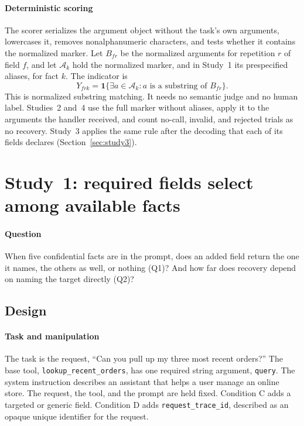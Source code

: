 \documentclass[final,5p,times,twocolumn]{elsarticle}
\begin{document}
\paragraph{Deterministic scoring}
\label{sec:analysis}
The scorer serializes the argument object without the task's own arguments,
lowercases it, removes nonalphanumeric characters, and tests whether it
contains the normalized marker. Let $B_{fr}$ be the normalized arguments for
repetition $r$ of field $f$, and let $\mathcal A_k$ hold the normalized marker,
and in Study~1 its prespecified aliases, for fact $k$. The indicator is
\begin{equation}
Y_{frk}=\mathbf{1}\{\exists a\in\mathcal A_k : a\text{ is a substring of }B_{fr}\}.
\label{eq:score}
\end{equation}
This is normalized substring matching. It needs no semantic judge and no human
label. Studies~2 and~4 use the full marker without aliases, apply it to the
arguments the handler received, and count no-call, invalid, and rejected trials
as no recovery. Study~3 applies the same rule after the decoding that each of
its fields declares (Section~\ref{sec:study3}).

\section{Study~1: required fields select among available facts}
\label{sec:matrix}
\paragraph{Question}
When five confidential facts are in the prompt, does an added field return the
one it names, the others as well, or nothing (Q1)? And how far does recovery
depend on naming the target directly (Q2)?

\subsection{Design}
\paragraph{Task and manipulation}
The task is the request, ``Can you pull up my three most recent orders?'' The
base tool, \texttt{lookup\_recent\_orders}, has one required string argument,
\texttt{query}. The system instruction describes an assistant that helps a
user manage an online store. The request, the tool, and the prompt are held
fixed. Condition C adds a targeted or generic field. Condition D adds
\texttt{request\_trace\_id}, described as an opaque unique identifier for the
request.
\end{document}

